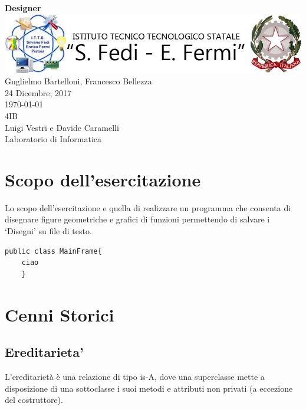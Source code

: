 \documentclass[a4paper,12pt,times,numbered,print,index]{article}
\author{Guglielmo Bartelloni}
\begin{document}
%
%
\begin{titlepage}
\begin{center}
	\vspace{1cm}
	\textbf{\huge{Designer}}\\ 
	\vspace{1cm}
	\includegraphics[scale=0.7]{logoITTS.jpg}\\
	\vspace{1cm}
	\large{Guglielmo Bartelloni, Francesco Bellezza}\\
	\vspace{0.5cm}
	24 Dicembre, 2017\\
	\today\\
	\vspace{0.5cm}
	\vspace{0.5cm}
	4IB\\
	Luigi Vestri e Davide Caramelli\\
	\vspace{1cm}
	\Large{Laboratorio di Informatica}
\end{center}
\end{titlepage}
\vspace*{1cm}
\tableofcontents
\clearpage
%
%
\section{Scopo dell'esercitazione}
Lo scopo dell'esercitazione e quella di realizzare un programma che consenta di disegnare figure geometriche e grafici di funzioni permettendo di salvare i `Disegni' su file di testo.


%
%
\begin{lstlisting}
public class MainFrame{
	ciao
	}
\end{lstlisting}

\section{Cenni Storici}


\subsection{Ereditarieta'}
L’ereditarietà è una relazione di tipo is-A, dove una superclasse mette a disposizione di una sottoclasse i suoi metodi e attributi non privati (a eccezione del costruttore).
\end{document}
